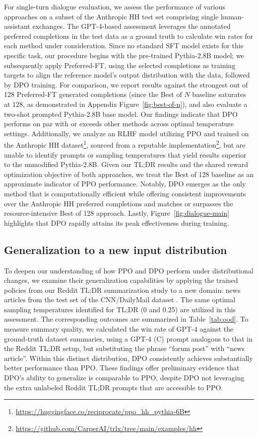 For single-turn dialogue evaluation, we assess the performance of various approaches on a subset of the Anthropic HH test set \citep{bai2022training} comprising single human-assistant exchanges. The GPT-4-based assessment leverages the annotated preferred completions in the test data as a ground truth to calculate win rates for each method under consideration. Since no standard SFT model exists for this specific task, our procedure begins with the pre-trained Pythia-2.8B model; we subsequently apply Preferred-FT, using the selected completions as training targets to align the reference model's output distribution with the data, followed by DPO training. For comparison, we report results against the strongest out of 128 Preferred-FT generated completions (since the Best of $N$ baseline saturates at 128, as demonstrated in Appendix Figure~\ref{fig:best-of-n}), and also evaluate a two-shot prompted Pythia-2.8B base model. Our findings indicate that DPO performs on par with or exceeds other methods across optimal temperature settings. Additionally, we analyze an RLHF model utilizing PPO and trained on the Anthropic HH dataset\footnote{\url{https://huggingface.co/reciprocate/ppo_hh_pythia-6B}}, sourced from a reputable implementation\footnote{\url{https://github.com/CarperAI/trlx/tree/main/examples/hh}}, but are unable to identify prompts or sampling temperatures that yield results superior to the unmodified Pythia-2.8B. Given our TL;DR results and the shared reward optimization objective of both approaches, we treat the Best of 128 baseline as an approximate indicator of PPO performance. Notably, DPO emerges as the only method that is computationally efficient while offering consistent improvements over the Anthropic HH preferred completions and matches or surpasses the resource-intensive Best of 128 approach. Lastly, Figure~\ref{fig:dialogue-main} highlights that DPO rapidly attains its peak effectiveness during training.

\subsection{Generalization to a new input distribution}

To deepen our understanding of how PPO and DPO perform under distributional changes, we examine their generalization capabilities by applying the trained policies from our Reddit TL;DR summarization study to a new domain: news articles from the test set of the CNN/DailyMail dataset \citep{nallapati-etal-2016-abstractive}. The same optimal sampling temperatures identified for TL;DR (0 and 0.25) are utilized in this assessment. The corresponding outcomes are summarized in Table~\ref{tab:ood}. To measure summary quality, we calculated the win rate of GPT-4 against the ground-truth dataset summaries, using a GPT-4 (C) prompt analogous to that in the Reddit TL;DR setup, but substituting the phrase ``forum post'' with ``news article''. Within this distinct distribution, DPO consistently achieves substantially better performance than PPO. These findings offer preliminary evidence that DPO’s ability to generalize is comparable to PPO, despite DPO not leveraging the extra unlabeled Reddit TL;DR prompts that are accessible to PPO.

